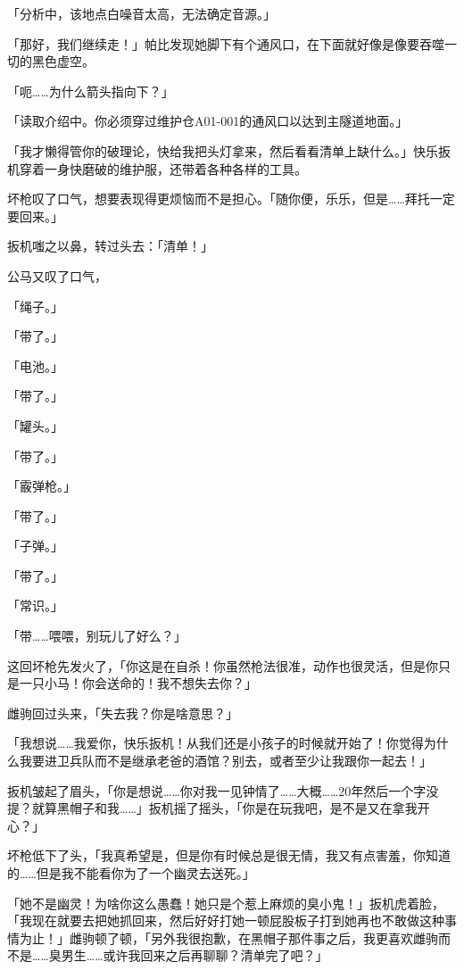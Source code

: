 「{\mt 分析中，该地点白噪音太高，无法确定音源。}」

「那好，我们继续走！」帕比发现她脚下有个通风口，在下面就好像是像要吞噬一切的黑色虚空。

「呃……为什么箭头指向下？」

「{\mt 读取介绍中。你必须穿过维护仓A01-001的通风口以达到主隧道地面。}」

\horizonline


「我才懒得管你的破理论，快给我把头灯拿来，然后看看清单上缺什么。」快乐扳机穿着一身快磨破的维护服，还带着各种各样的工具。

坏枪叹了口气，想要表现得更烦恼而不是担心。「随你便，乐乐，但是……拜托一定要回来。」

扳机嗤之以鼻，转过头去：「清单！」

公马又叹了口气，

「绳子。」

「带了。」

「电池。」

「带了。」

「罐头。」

「带了。」

「霰弹枪。」

「带了。」

「子弹。」

「带了。」

「常识。」

「带……喂喂，别玩儿了好么？」

这回坏枪先发火了，「你这是在自杀！你虽然枪法很准，动作也很灵活，但是你只是一只小马！你会送命的！我不想失去你？」

雌驹回过头来，「失去我？你是啥意思？」

「我想说……我爱你，快乐扳机！从我们还是小孩子的时候就开始了！你觉得为什么我要进卫兵队而不是继承老爸的酒馆？别去，或者至少让我跟你一起去！」

扳机皱起了眉头，「你是想说……你对我一见钟情了……大概……20年然后一个字没提？就算黑帽子和我……」扳机摇了摇头，「你是在玩我吧，是不是又在拿我开心？」

坏枪低下了头，「我真希望是，但是你有时候总是很无情，我又有点害羞，你知道的……但是我不能看你为了一个幽灵去送死。」

「她不是幽灵！为啥你这么愚蠢！她只是个惹上麻烦的臭小鬼！」扳机虎着脸，「我现在就要去把她抓回来，然后好好打她一顿屁股板子打到她再也不敢做这种事情为止！」雌驹顿了顿，「另外我很抱歉，在黑帽子那件事之后，我更喜欢雌驹而不是……臭男生……或许我回来之后再聊聊？清单完了吧？」

